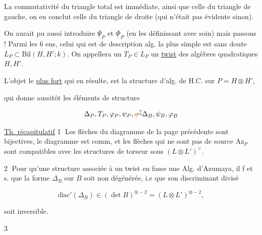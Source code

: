 La commutativité du triangle total
est immédiate, ainsi que celle du
triangle de gauche, on en conclut
celle du triangle de droite (qui
n'était pas évidente sinon).

 On aurait pu aussi
introduire $\underline\Psi_P$ et $\underline\Phi_P$ (en les définissant
avec soin) mais passons ! Parmi les
6  ens, celui qui est de
description alg. la plus simple est
sans doute $L_P\subset\mathrm{Bil}(H,H';k)$. On
appellera un $T_P\in L_P$ un \uline{twist}
des algèbres  quadratiques
$H,H'$.


L'objet le \uline{plus fort}
qui en résulte, est la structure
d'alg. de H.C. sur $P=H\otimes H'$,


qui donne aussitôt les éléments
de structure

\[
\Delta_P,T_P,\varphi_P,\psi_P,\deleted{\unsure{\varphi}}\Delta_B,\psi_B,\varphi_B
\]

\uline{Th. récapitulatif} \textcircled{1} Les flèches
du diagramme de la page précédente
sont bijectives, le diagramme est
comm, et les  flèches qui ne sont
pas de source $\mathrm{Az}_P$ sont compatibles
avec les structures de torseur
sous $(L\otimes L')^\vee$.

\textcircled{2} Pour qu'une structure  associée
à un twist en fasse une Alg.
d'Azumaya, il f et s. que
la forme $\Delta_B$ sur $B$ soit non
dégénérée, i.e que son discriminant
divisé

\[
\mathrm{disc}'(\Delta_B)\in(\det B)^{\otimes-2}=(L\otimes L')^{\otimes-2},
\]

soit inversible.


\textcircled{3}


